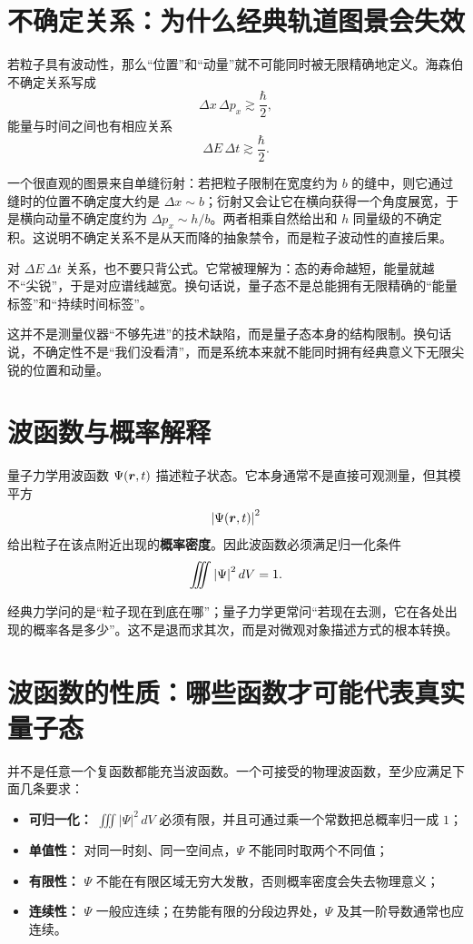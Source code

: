 \documentclass[lang=cn,11pt]{elegantbook}
\newcommand{\bridge}[1]{\begin{note}#1\end{note}}
\begin{document}
\section{不确定关系：为什么经典轨道图景会失效}

若粒子具有波动性，那么“位置”和“动量”就不可能同时被无限精确地定义。海森伯不确定关系写成
\[
\Delta x\,\Delta p_x\gtrsim \frac{\hbar}{2},
\]
能量与时间之间也有相应关系
\[
\Delta E\,\Delta t\gtrsim \frac{\hbar}{2}.
\]

一个很直观的图景来自单缝衍射：若把粒子限制在宽度约为 \(b\) 的缝中，则它通过缝时的位置不确定度大约是 \(\Delta x\sim b\)；衍射又会让它在横向获得一个角度展宽，于是横向动量不确定度约为 \(\Delta p_x\sim h/b\)。两者相乘自然给出和 \(h\) 同量级的不确定积。这说明不确定关系不是从天而降的抽象禁令，而是粒子波动性的直接后果。

对 \(\Delta E\,\Delta t\) 关系，也不要只背公式。它常被理解为：态的寿命越短，能量就越不“尖锐”，于是对应谱线越宽。换句话说，量子态不是总能拥有无限精确的“能量标签”和“持续时间标签”。

\begin{note}
这并不是测量仪器“不够先进”的技术缺陷，而是量子态本身的结构限制。换句话说，不确定性不是“我们没看清”，而是系统本来就不能同时拥有经典意义下无限尖锐的位置和动量。
\end{note}

\section{波函数与概率解释}

量子力学用波函数 \(\Psi(\vb*{r},t)\) 描述粒子状态。它本身通常不是直接可观测量，但其模平方
\[
\abs{\Psi(\vb*{r},t)}^2
\]
给出粒子在该点附近出现的\textbf{概率密度}。因此波函数必须满足归一化条件
\[
\iiint \abs{\Psi}^2\,dV=1.
\]

\bridge{经典力学问的是“粒子现在到底在哪”；量子力学更常问“若现在去测，它在各处出现的概率各是多少”。这不是退而求其次，而是对微观对象描述方式的根本转换。}

\section{波函数的性质：哪些函数才可能代表真实量子态}

并不是任意一个复函数都能充当波函数。一个可接受的物理波函数，至少应满足下面几条要求：
\begin{itemize}
  \item \textbf{可归一化：} \(\iiint |\Psi|^2\,dV\) 必须有限，并且可通过乘一个常数把总概率归一成 \(1\)；
  \item \textbf{单值性：} 对同一时刻、同一空间点，\(\Psi\) 不能同时取两个不同值；
  \item \textbf{有限性：} \(\Psi\) 不能在有限区域无穷大发散，否则概率密度会失去物理意义；
  \item \textbf{连续性：} \(\Psi\) 一般应连续；在势能有限的分段边界处，\(\Psi\) 及其一阶导数通常也应连续。
\end{itemize}
\end{document}
